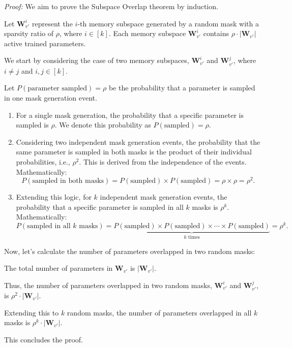 \textit{Proof:} We aim to prove the Subspace Overlap theorem by induction.

Let $\mathbf{W}_{v'}^{i}$ represent the $i$-th memory subspace generated by a random mask with a sparsity ratio of $\rho$, where $i \in [k]$. Each memory subspace $\mathbf{W}_{v'}^{i}$ contains $\rho\cdot|\mathbf{W}_{v'}|$ active trained parameters.

We start by considering the case of two memory subspaces, $\mathbf{W}_{v'}^{i}$ and $\mathbf{W}_{v'}^{j}$, where $i \neq j$ and $i, j \in [k]$.

Let $P(\text{parameter sampled}) = \rho$ be the probability that a parameter is sampled in one mask generation event.

\begin{enumerate}
    \item For a single mask generation, the probability that a specific parameter is sampled is $\rho$. We denote this probability as $P(\text{sampled}) = \rho$.
    \item Considering two independent mask generation events, the probability that the same parameter is sampled in both masks is the product of their individual probabilities, i.e., $\rho^2$. This is derived from the independence of the events. Mathematically:
    \[ P(\text{sampled in both masks}) = P(\text{sampled}) \times P(\text{sampled}) = \rho \times \rho = \rho^2. \]
    \item Extending this logic, for $k$ independent mask generation events, the probability that a specific parameter is sampled in all $k$ masks is $\rho^k$. Mathematically:
    \[ P(\text{sampled in all } k \text{ masks}) = \underbrace{P(\text{sampled}) \times P(\text{sampled}) \times \cdots \times P(\text{sampled})}_{k \text{ times}} = \rho^k. \]
\end{enumerate}

Now, let's calculate the number of parameters overlapped in two random masks:

The total number of parameters in $\mathbf{W}_{v'}$ is $|\mathbf{W}_{v'}|$.

Thus, the number of parameters overlapped in two random masks, $\mathbf{W}_{v'}^{i}$ and $\mathbf{W}_{v'}^{j}$, is $\rho^2\cdot|\mathbf{W}_{v'}|$.

Extending this to $k$ random masks, the number of parameters overlapped in all $k$ masks is $\rho^k\cdot|\mathbf{W}_{v'}|$.

This concludes the proof.

\qedsymbol
